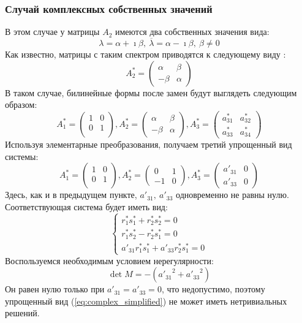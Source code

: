 \subsubsection{Случай комплексных собственных значений}
В этом случае у матрицы $A_2$ имеются два собственных значения вида: 
$$
	\lambda = \alpha + \imath \beta,~\overline{\lambda} = \alpha - \imath \beta,~\beta \ne 0
$$ 
Как известно, матрицы с таким спектром приводятся к следующему виду \cite{tyrtyshnikov_ma}: 
$$ 
	A^*_2 = 
	\begin{pmatrix}
		\alpha & \beta \\
		-\beta & \alpha
	\end{pmatrix}
$$
В таком случае, билинейные формы после замен будут выглядеть следующим образом:
\begin{equation}
	A^*_1 = 
	\begin{pmatrix}
		1 & 0 \\
		0 & 1 \\
	\end{pmatrix}, 
	A^*_2 = 
	\begin{pmatrix}
		\alpha & \beta \\
		-\beta & \alpha
	\end{pmatrix},
	A^*_3 = 
	\begin{pmatrix}
		a^*_{31} & a^*_{32} \\
		a^*_{33} & a^*_{34}
	\end{pmatrix}
\end{equation}
Используя элементарные преобразования, получаем третий упрощенный вид системы: 
\begin{equation}\label{eq:complex_simplified}
	A^*_1 = 
	\begin{pmatrix}
		1 & 0 \\
		0 & 1 \\
	\end{pmatrix}, 
	A^*_2 = 
	\begin{pmatrix}
		0 & 1 \\
		-1 & 0
	\end{pmatrix},
	A^*_3 = 
	\begin{pmatrix}
		a'_{31} & 0 \\
		a'_{33} & 0
	\end{pmatrix}
\end{equation}
Здесь, как и в предыдущем пункте, $a'_{31},~a'_{33}$ одновременно не равны нулю. 
Соответствующая система будет иметь вид:
\begin{equation}
	\begin{cases}
		r^*_1s^*_1 + r^*_2s^*_2 = 0 \\ 
		r^*_1s^*_2 - r^*_2s^*_1 = 0 \\
		a'_{31}r^*_1s^*_1 + a'_{33}r^*_2s^*_1 = 0
	\end{cases}
\end{equation}
Воспользуемся необходимым условием нерегулярности: 
$$
	\det M = -({a'_{31}}^2 + {a'_{33}}^2)
$$
Он равен нулю только при $a'_{31} = a'_{33} = 0$, что недопустимо, поэтому упрощенный вид 
(\ref{eq:complex_simplified}) не может иметь нетривиальных решений. 

